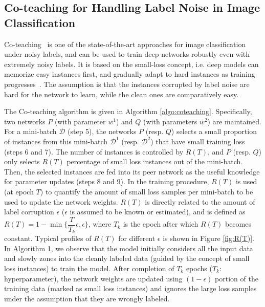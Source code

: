 \subsection{Co-teaching for Handling Label Noise in Image Classification}
Co-teaching~\cite{coteaching} is one of the state-of-the-art approaches for image classification under noisy labels, and can be used to train deep networks robustly even with extremely noisy labels.
It is based on the small-loss concept, i.e. deep models can memorize easy instances first, and gradually adapt to hard instances as training progresses~\cite{memorization}. 
The assumption is that the instances corrupted by label noise are hard for the network to learn, while the clean ones are comparatively easy. 

The Co-teaching algorithm is given in Algorithm \ref{algo:coteaching}.
Specifically, two networks $P$ (with parameter $w^1$) and $Q$ (with parameters $w^2$) are maintained. 
For a mini-batch $\mathcal{D}$ (step 5), the networks $P$ (resp. $Q$) selects a small proportion of instances from this mini-batch $\mathcal{D}^1$ (resp. $\mathcal{D}^2$) that have small training loss (steps 6 and 7). 
The number of instances is controlled by $R(T)$, and $P$ (resp. $Q$) only selects $R(T)$ percentage of small loss instances out of the mini-batch. Then, the selected instances are fed into its peer network as the useful knowledge for parameter updates (steps 8 and 9).
In the training procedure, $R(T)$ is used (at epoch $T$) to quantify the amount of small loss
samples per mini-batch to be used to update the network weights. $R(T)$ is directly related
to the amount of label corruption $\epsilon$ ($\epsilon$ is assumed to be known or estimated), and is defined as $R(T)= 1- \min\bigg\{\dfrac{T}{T_k}\epsilon, \epsilon\bigg\}$, where $T_k$ is the epoch after which $R(T)$ becomes constant. Typical profiles of $R(T)$ for different $\epsilon$ is shown in Figure \ref{fig:R(T)}. 
In Algorithm 1, we observe that the model initially considers all the input data and slowly zones into the cleanly labeled data (guided by the concept of small loss instances) to train the model. After completion of $T_k$ epochs ($T_k$: hyperparameter), the network weights are updated using $(1 - \epsilon)$ portion of the training data (marked as small loss instances) and ignores the large loss samples under the assumption that they are wrongly labeled.
